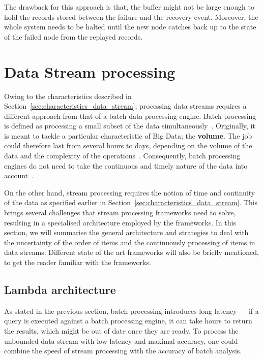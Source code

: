 The drawback for this approach is that, the buffer might not be large enough to 
hold the records stored between the failure and the recovery event. Moreover, 
the whole system needs to be halted until the new node catches back up to 
the state of the failed node from the replayed records. 

\section{Data Stream processing}

Owing to the characteristics described in Section~\ref{sec:characteristics_data_stream}, 
processing data streams requires a different approach from that of a batch data processing engine.
Batch processing is defined as processing a small subset of the data simultaneously~\cite{batch_processing}. 
Originally, it is meant to tackle a particular characteristic of Big Data; the \textbf{volume}. The job 
could therefore last from several hours to days, depending on the volume of the data and the 
complexity of the operations~\cite{batch_duration}.
Consequently, batch processing engines do not need to take the continuous and 
timely nature of the data into account~\cite{flink}.

On the other hand, stream processing requires the notion of time and continuity of the data as 
specified earlier in Section~\ref{sec:characteristics_data_stream}. This brings several challenges 
that stream processing frameworks need to solve, resulting in a specialised architecture employed by the 
frameworks. In this section, we will summarise the general architecture and strategies to deal with the 
uncertainty of the order of items and the continuously processing of items in data streams. Different 
state of the art frameworks will also be briefly mentioned, to get the reader familiar with the 
frameworks. 

\newpage

\subsection{Lambda architecture}

As stated in the previous section, batch processing introduces long latency --- if a query 
is executed against a batch processing engine, it can take hours to return the results, which might be 
out of date once they are ready. To process the unbounded data stream with low latency and maximal accuracy,
one could combine the speed of stream processing with the accuracy of batch analysis. 


